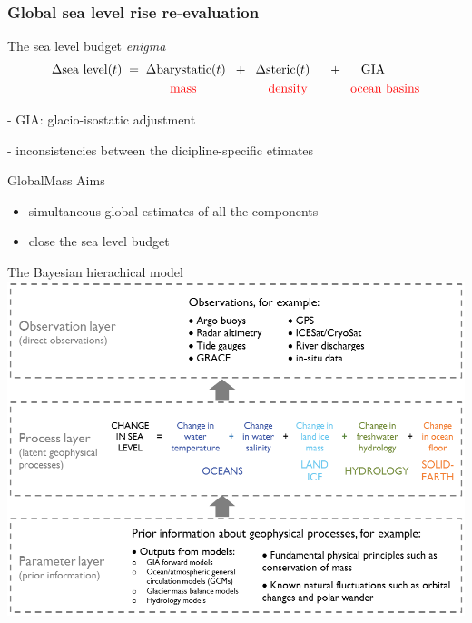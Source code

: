 \documentclass{beamer}
\begin{document}
\begin{frame}
\frametitle{Global sea level rise re-evaluation}
\begin{block}{The sea level budget \emph{enigma}}
\begin{align*}
&\Delta \mbox{sea level} (t) \hspace{0.1cm}= \hspace{0.1cm} \Delta\mbox{barystatic}(t) \hspace{0.2cm} + \hspace{0.2cm} \Delta\mbox{steric}(t) \hspace{0.5cm}+ \hspace{0.5cm} \mbox{GIA}\\
&\color{red}\hspace{3.3cm} \mbox{mass} \hspace{2cm}\mbox{density} \hspace{1.2cm} \mbox{ocean basins}
\end{align*}

- GIA: glacio-isostatic adjustment

- inconsistencies between the dicipline-specific etimates
\end{block}
\begin{block}{GlobalMass Aims}
\begin{itemize}
\item simultaneous global estimates of all the components
\item close the sea level budget
\end{itemize}
\end{block}

\end{frame}

\begin{frame}{The Bayesian hierachical model}
\vspace{0.5cm}
\centering
\includegraphics[height = 0.7\textheight]{images/GMconcept-simplified}

\end{frame}
\end{document}
